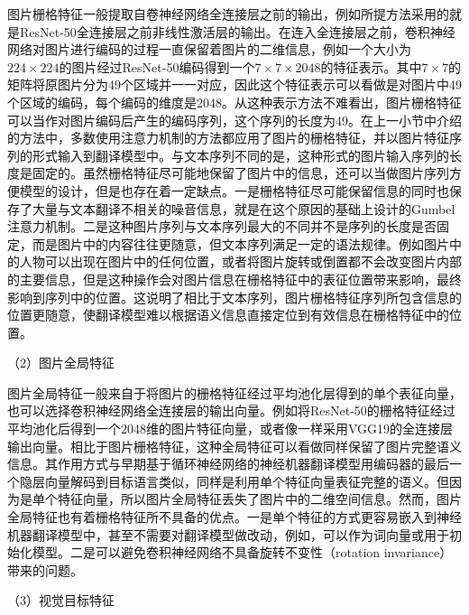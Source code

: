 图片栅格特征一般提取自卷神经网络全连接层之前的输出，例如所提方法采用的就是ResNet-50全连接层之前非线性激活层的输出。在连入全连接层之前，卷积神经网络对图片进行编码的过程一直保留着图片的二维信息，例如一个大小为$224 \times 224$的图片经过ResNet-50编码得到一个$7 \times 7 \times 2048$的特征表示。其中$7 \times 7$的矩阵将原图片分为49个区域并一一对应，因此这个特征表示可以看做是对图片中49个区域的编码，每个编码的维度是2048。从这种表示方法不难看出，图片栅格特征可以当作对图片编码后产生的编码序列，这个序列的长度为49。在上一小节中介绍的方法中，多数使用注意力机制的方法都应用了图片的栅格特征，并以图片特征序列的形式输入到翻译模型中。与文本序列不同的是，这种形式的图片输入序列的长度是固定的。虽然栅格特征尽可能地保留了图片中的信息，还可以当做图片序列方便模型的设计，但是也存在着一定缺点。一是栅格特征尽可能保留信息的同时也保存了大量与文本翻译不相关的噪音信息，就是在这个原因的基础上设计的Gumbel注意力机制。二是这种图片序列与文本序列最大的不同并不是序列的长度是否固定，而是图片中的内容往往更随意，但文本序列满足一定的语法规律。例如图片中的人物可以出现在图片中的任何位置，或者将图片旋转或倒置都不会改变图片内部的主要信息，但是这种操作会对图片信息在栅格特征中的表征位置带来影响，最终影响到序列中的位置。这说明了相比于文本序列，图片栅格特征序列所包含信息的位置更随意，使翻译模型难以根据语义信息直接定位到有效信息在栅格特征中的位置。

{\sffamily （2）图片全局特征}

图片全局特征一般来自于将图片的栅格特征经过平均池化层得到的单个表征向量，也可以选择卷积神经网络全连接层的输出向量。例如将ResNet-50的栅格特征经过平均池化后得到一个2048维的图片特征向量，或者像一样采用VGG19的全连接层输出向量。相比于图片栅格特征，这种全局特征可以看做同样保留了图片完整语义信息。其作用方式与早期基于循环神经网络的神经机器翻译模型用编码器的最后一个隐层向量解码到目标语言类似，同样是利用单个特征向量表征完整的语义。但因为是单个特征向量，所以图片全局特征丢失了图片中的二维空间信息。然而，图片全局特征也有着栅格特征所不具备的优点。一是单个特征的方式更容易嵌入到神经机器翻译模型中，甚至不需要对翻译模型做改动，例如，可以作为词向量或用于初始化模型。二是可以避免卷积神经网络不具备旋转不变性（rotation invariance）带来的问题。

{\sffamily （3）视觉目标特征}

